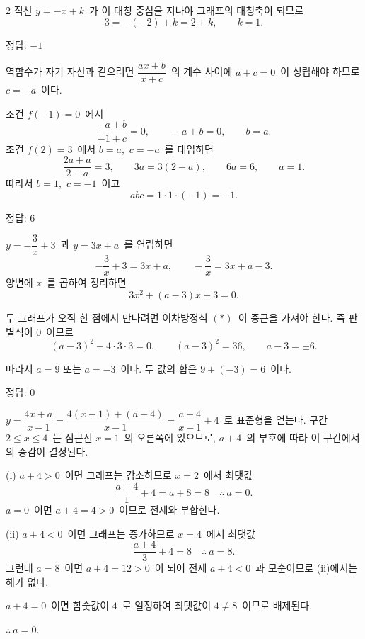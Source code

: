 \documentclass[10pt,fleqn]{article}
\begin{document}
\begin{multicols*}{2}
직선 $y=-x+k$\ 가 이 대칭 중심을 지나야 그래프의 대칭축이 되므로
\[ 3=-(-2)+k=2+k,\qquad k=1. \]

\begin{dmanswerbox}
정답: $-1$
\end{dmanswerbox}

역함수가 자기 자신과 같으려면 $\dfrac{ax+b}{x+c}$\ 의 계수 사이에 $a+c=0$\ 이 성립해야 하므로 $c=-a$\ 이다.

조건 $f(-1)=0$\ 에서
\[ \dfrac{-a+b}{-1+c}=0,\qquad -a+b=0,\qquad b=a. \]
조건 $f(2)=3$\ 에서 $b=a$,\ $c=-a$\ 를 대입하면
\[ \dfrac{2a+a}{2-a}=3,\qquad 3a=3(2-a),\qquad 6a=6,\qquad a=1. \]
따라서 $b=1$,\ $c=-1$\ 이고
\[ abc=1\cdot 1\cdot(-1)=-1. \]
\begin{dmanswerbox}
정답: $6$
\end{dmanswerbox}

$y=-\dfrac{3}{x}+3$\ 과 $y=3x+a$\ 를 연립하면
\[ -\dfrac{3}{x}+3=3x+a,\qquad -\dfrac{3}{x}=3x+a-3. \]
양변에 $x$\ 를 곱하여 정리하면
\[ 3x^{2}+(a-3)x+3=0. \tag{$\ast$} \]

두 그래프가 오직 한 점에서 만나려면 이차방정식 $(\ast)$\ 이 중근을 가져야 한다. 즉 판별식이 $0$\ 이므로
\[ (a-3)^{2}-4\cdot 3\cdot 3=0,\qquad (a-3)^{2}=36,\qquad a-3=\pm 6. \]

따라서 $a=9$ 또는 $a=-3$\ 이다. 두 값의 합은 $9+(-3)=6$\ 이다.
\begin{dmanswerbox}
정답: $0$
\end{dmanswerbox}

$y=\dfrac{4x+a}{x-1}=\dfrac{4(x-1)+(a+4)}{x-1}=\dfrac{a+4}{x-1}+4$\ 로 표준형을 얻는다. 구간 $2\le x\le 4$\ 는 점근선 $x=1$\ 의 오른쪽에 있으므로, $a+4$\ 의 부호에 따라 이 구간에서의 증감이 결정된다.

\medskip
(i) $a+4>0$\ 이면 그래프는 감소하므로 $x=2$\ 에서 최댓값
\[ \dfrac{a+4}{1}+4=a+8=8\quad\therefore\ a=0. \]
$a=0$\ 이면 $a+4=4>0$\ 이므로 전제와 부합한다.

\medskip
(ii) $a+4<0$\ 이면 그래프는 증가하므로 $x=4$\ 에서 최댓값
\[ \dfrac{a+4}{3}+4=8\quad\therefore\ a=8. \]
그런데 $a=8$\ 이면 $a+4=12>0$\ 이 되어 전제 $a+4<0$\ 과 모순이므로 (ii)에서는 해가 없다.

\medskip
$a+4=0$\ 이면 함숫값이 $4$\ 로 일정하여 최댓값이 $4\ne 8$\ 이므로 배제된다.

$\therefore\ a=0$.
\end{multicols*}
\end{document}
